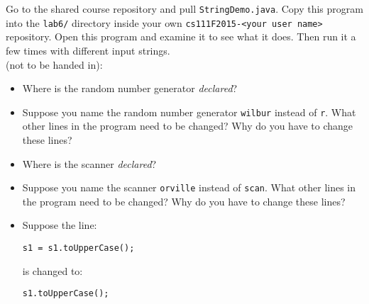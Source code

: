 Go to the shared course repository and pull {\tt StringDemo.java}. Copy this program into the {\tt lab6/} directory
inside your own {\tt cs111F2015-<your user name>} repository.  Open this program and examine it to see what it does.
Then run it a few times with different input strings.\\

(not to be handed in):
\begin{itemize}
\item Where is the random number generator {\em declared}?
\item Suppose you name the random number generator {\tt wilbur} instead of {\tt r}.
What other lines in the program need to be changed? Why do you have to change these lines?
\item Where is the scanner {\em declared}?
\item Suppose you name the scanner {\tt orville} instead of {\tt scan}.
What other lines in the program need to be changed? Why do you have to change these lines?
\item
Suppose the line:

\vspace*{-.2in}
\begin{center}
\verb$s1 = s1.toUpperCase();$
\end{center}
\vspace*{-.2in}

is changed to:

\vspace*{-.2in}
\begin{center}
\verb$s1.toUpperCase();$
\end{center}


\end{itemize}
